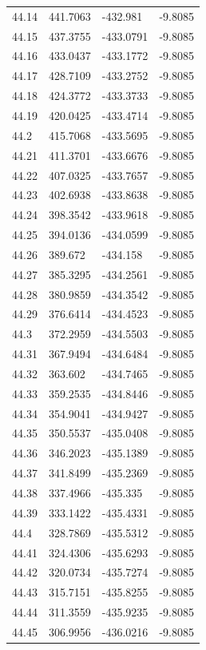 \begin{table}[H]
\begin{tabular}{llll}
44.14 & 441.7063 & -432.981 & -9.8085 \\
44.15 & 437.3755 & -433.0791 & -9.8085 \\
44.16 & 433.0437 & -433.1772 & -9.8085 \\
44.17 & 428.7109 & -433.2752 & -9.8085 \\
44.18 & 424.3772 & -433.3733 & -9.8085 \\
44.19 & 420.0425 & -433.4714 & -9.8085 \\
44.2 & 415.7068 & -433.5695 & -9.8085 \\
44.21 & 411.3701 & -433.6676 & -9.8085 \\
44.22 & 407.0325 & -433.7657 & -9.8085 \\
44.23 & 402.6938 & -433.8638 & -9.8085 \\
44.24 & 398.3542 & -433.9618 & -9.8085 \\
44.25 & 394.0136 & -434.0599 & -9.8085 \\
44.26 & 389.672 & -434.158 & -9.8085 \\
44.27 & 385.3295 & -434.2561 & -9.8085 \\
44.28 & 380.9859 & -434.3542 & -9.8085 \\
44.29 & 376.6414 & -434.4523 & -9.8085 \\
44.3 & 372.2959 & -434.5503 & -9.8085 \\
44.31 & 367.9494 & -434.6484 & -9.8085 \\
44.32 & 363.602 & -434.7465 & -9.8085 \\
44.33 & 359.2535 & -434.8446 & -9.8085 \\
44.34 & 354.9041 & -434.9427 & -9.8085 \\
44.35 & 350.5537 & -435.0408 & -9.8085 \\
44.36 & 346.2023 & -435.1389 & -9.8085 \\
44.37 & 341.8499 & -435.2369 & -9.8085 \\
44.38 & 337.4966 & -435.335 & -9.8085 \\
44.39 & 333.1422 & -435.4331 & -9.8085 \\
44.4 & 328.7869 & -435.5312 & -9.8085 \\
44.41 & 324.4306 & -435.6293 & -9.8085 \\
44.42 & 320.0734 & -435.7274 & -9.8085 \\
44.43 & 315.7151 & -435.8255 & -9.8085 \\
44.44 & 311.3559 & -435.9235 & -9.8085 \\
44.45 & 306.9956 & -436.0216 & -9.8085 \\

\end{tabular}
\end{table}
